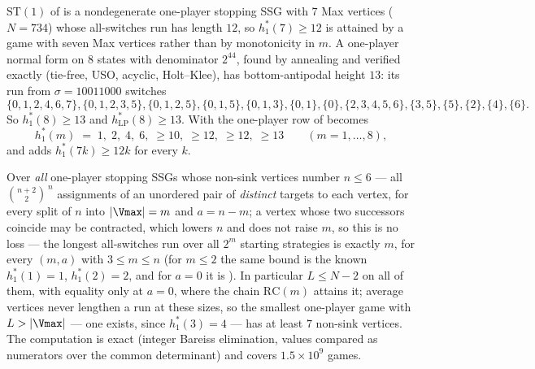 \begin{proposition}\label{oph:h78}
$\mathrm{ST}(1)$ of  is a nondegenerate one-player stopping SSG with
$7$ Max vertices ($N=734$) whose all-switches run has length $12$, so
$h^{\ast}_{1}(7)\ge12$ is attained by a game with seven Max vertices rather than by
monotonicity in $m$. A one-player normal form on $8$ states with denominator $2^{44}$,
found by annealing and verified exactly (tie-free, USO, acyclic, Holt--Klee),
has bottom-antipodal height $13$: its run from $\sigma=10011000$ switches
\[
\{0,1,2,4,6,7\},\{0,1,2,3,5\},\{0,1,2,5\},\{0,1,5\},\{0,1,3\},\{0,1\},\{0\},
\{2,3,4,5,6\},\{3,5\},\{5\},\{2\},\{4\},\{6\}.
\]
So $h^{\ast}_{1}(8)\ge13$ and $h^{\ast}_{\mathrm{LP}}(8)\ge13$. With
 the one-player row of  becomes
\[
  h^{\ast}_{1}(m)\;=\;1,\;2,\;4,\;6,\;\ge10,\;\ge12,\;\ge12,\;\ge13\qquad(m=1,\dots,8),
\]
and  adds $h^{\ast}_{1}(7k)\ge12k$ for every $k$.
\end{proposition}

\begin{proposition}\label{oph:exhaustive}
Over \emph{all} one-player stopping SSGs whose non-sink vertices number
$n\le 6$ --- all $\binom{n+2}{2}^{\,n}$ assignments of an unordered pair of
\emph{distinct} targets to each vertex, for every split of $n$ into $|\Vmax|=m$ and
$a=n-m$; a vertex whose two successors coincide may be contracted, which lowers $n$
and does not raise $m$, so this is no loss --- the longest all-switches run over all
$2^{m}$ starting strategies is exactly $m$, for every $(m,a)$ with $3\le m\le n$
(for $m\le2$ the same bound is the known $h^{\ast}_{1}(1)=1$, $h^{\ast}_{1}(2)=2$, and
for $a=0$ it is ). In particular $L\le N-2$ on all of them,
with equality only at $a=0$, where the chain $\mathrm{RC}(m)$ attains it; average
vertices never lengthen a run at these sizes, so the smallest one-player game with
$L>|\Vmax|$ --- one exists, since $h^{\ast}_{1}(3)=4$ --- has at least $7$ non-sink
vertices. The computation is exact (integer Bareiss elimination, values compared as
numerators over the common determinant) and covers $1.5\times10^{9}$ games.
\end{proposition}


